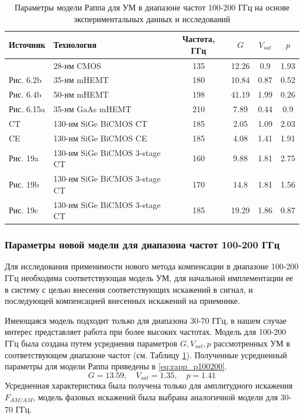 \begin{table}[h]
    \centering
    \begin{tabular}{llcccc}
        \hline
    Источник              & Технология   & Частота, ГГц & $G$  & $V_{sat}$ & $p$ \\ \hline
    \cite{zhang2021}      & 28-нм CMOS   &  135         & 12.26 & 0.9      & 1.93  \\
    \cite{amadorey2018} Рис. 6.2b  & 35-нм mHEMT      &  180  & 10.84 & 0.87 & 0.52 \\
    \cite{amadorey2018} Рис. 6.4b  & 50-нм mHEMT      &  198  & 41.19 & 1.99 & 0.26  \\
    \cite{amadorey2018} Рис. 6.15a & 35-нм GaAs mHEMT &  210  & 7.89  & 0.44 & 0.9  \\
    \cite{aliyun2020} CT       &  130-нм SiGe BiCMOS CT        & 185 & 2.05  & 1.09 & 2.03  \\
    \cite{aliyun2020} CE       & 130-нм SiGe BiCMOS CE         & 185 & 4.08  & 1.41 & 1.91  \\
    \cite{aliyun2020} Рис. 19a & 130-нм SiGe BiCMOS 3-stage CT & 160 & 9.88  & 1.81 & 2.75  \\
    \cite{aliyun2020} Рис. 19b & 130-нм SiGe BiCMOS 3-stage CT & 170 & 14.8  & 1.81 & 1.56  \\
    \cite{aliyun2020} Рис. 19c & 130-нм SiGe BiCMOS 3-stage CT & 185 & 19.29 & 1.86 & 0.87  \\\hline
    \end{tabular}
    \caption{Параметры модели Раппа для УМ в диапазоне частот 100-200 ГГц
    на основе экспериментальных данных и исследований}
    \label{tab:pa_params}
\end{table}

\subsubsection{Параметры новой модели для диапазона частот 100-200 ГГц}
Для исследования применимости нового метода компенсации в диапазоне 100-200
ГГц необходима соответствующая модель УМ, для начальной имплементации ее в
систему с целью внесения соответствующих искажений в сигнал, и последующей
компенсацией внесенных искажений на приемнике. 

Имеющаяся модель \cite{nokia163314} подходит только для диапазона  30-70
ГГц, в нашем случае интерес представляет работа при более высоких частотах.
Модель для 100-200 ГГц была создана путем усреднения параметров $G,
V_{sat}, p$ рассмотренных УМ в соответствующем диапазоне частот (см. Таблицу
\ref{tab:pa_params}). Полученные усредненный параметры для модели Раппа
приведены в \ref{eq:rapp_p100200}.
\begin{equation}
    G = 13.59, \quad V_{sat} = 1.35, \quad p = 1.41
    \label{eq:rapp_p100200}
\end{equation}
Усредненная характеристика была получена только для амплитудного искажения $F_{AM/AM}$,
модель фазовых искажений была выбрана аналогичной модели для 30-70 ГГц.

